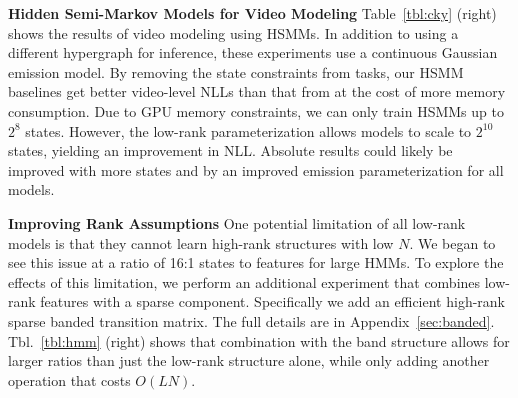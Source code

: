 \documentclass{article}
\begin{document}
\textbf{Hidden Semi-Markov Models for Video Modeling} Table~\ref{tbl:cky} (right)
shows the results of video modeling using HSMMs.
In addition to using a different hypergraph for inference,
these experiments use a continuous Gaussian emission model.
By removing the state constraints from tasks,
our HSMM baselines get better video-level NLLs than that from \citet{fried2020learning}
at the cost of more memory consumption.
Due to GPU memory constraints, we can only train HSMMs up to $2^8$ states.
However, the low-rank parameterization allows models to scale to $2^{10}$ states,
yielding an improvement in NLL.
Absolute results could likely be improved with more states and by an
improved emission parameterization for all models.

\textbf{Improving Rank Assumptions}
One potential limitation of all low-rank models is that they cannot learn high-rank structures with low $N$.
We began to see this issue at a ratio of 16:1 states to features for large HMMs.
To explore the effects of this limitation, we perform an additional experiment that combines low-rank features with a sparse component. Specifically we add an efficient high-rank sparse banded transition matrix. 
The full details are in Appendix~\ref{sec:banded}.
Tbl.~\ref{tbl:hmm} (right) shows that combination with the band structure allows for larger ratios than just the low-rank structure alone, while only adding another operation that costs $O(LN)$.
\end{document}
